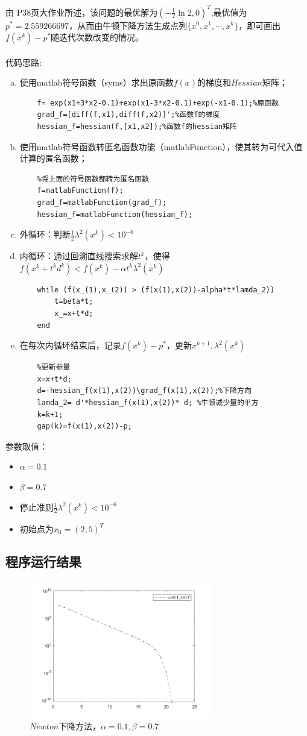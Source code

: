 \documentclass{article}
\begin{document}
由 P38页大作业所述，该问题的最优解为$\left(-\frac{1}{2}\ln 2,0\right)^T$,最优值为$p^\ast=2.559266697$，从而由牛顿下降方法生成点列$\{x^0,x^1,\dotsb,x^k \}$，即可画出$f(x^k)-p^\ast$随迭代次数改变的情况。
\\ \hspace*{\fill} \\
代码思路:
\begin{enumerate}[a)]
    \item 使用matlab符号函数（syms）求出原函数$f(x)$的梯度和$Hessian$矩阵；
    \begin{lstlisting}
    f= exp(x1+3*x2-0.1)+exp(x1-3*x2-0.1)+exp(-x1-0.1);%原函数
    grad_f=[diff(f,x1),diff(f,x2)]';%函数f的梯度
    hessian_f=hessian(f,[x1,x2]);%函数f的hessian矩阵
    \end{lstlisting}
    \item 使用matlab符号函数转匿名函数功能（matlabFunction），使其转为可代入值计算的匿名函数；
    \begin{lstlisting}
    %将上面的符号函数都转为匿名函数
    f=matlabFunction(f);
    grad_f=matlabFunction(grad_f);
    hessian_f=matlabFunction(hessian_f);
    \end{lstlisting}
    \item 外循环：判断$\frac{1}{2}\lambda^2(x^k)<10^{-6}$
    \item 内循环：通过回溯直线搜索求解$t^k$，使得$f(x^k+t^kd^k)<f(x^k)-\alpha t^k \lambda^2(x^k)$
    \begin{lstlisting}
    while (f(x_(1),x_(2)) > (f(x(1),x(2))-alpha*t*lamda_2))
        t=beta*t;
        x_=x+t*d;
    end
    \end{lstlisting}
    \item 在每次内循环结束后，记录$f(x^k)-p^\ast$，更新$x^{k+1},\lambda^2(x^k)$
    \begin{lstlisting}
    %更新参量
    x=x+t*d;
    d=-hessian_f(x(1),x(2))\grad_f(x(1),x(2));%下降方向
    lamda_2= d'*hessian_f(x(1),x(2))* d; %牛顿减少量的平方
    k=k+1;
    gap(k)=f(x(1),x(2))-p;
    \end{lstlisting}
\end{enumerate}

参数取值：
\begin{itemize}
    \item $\alpha=0.1$
    \item $\beta=0.7$
    \item 停止准则$\frac{1}{2} \lambda^2(x^k)<10^{-6}$
    \item 初始点为$x_0=(2,5)^T$
\end{itemize}


\subsection{程序运行结果}
\begin{figure}[H]
    \centering
    \includegraphics[width=8cm]{Fig/newton.png}
    \caption{$Newton$下降方法，$\alpha=0.1,\beta=0.7$}
\end{figure}
\end{document}
